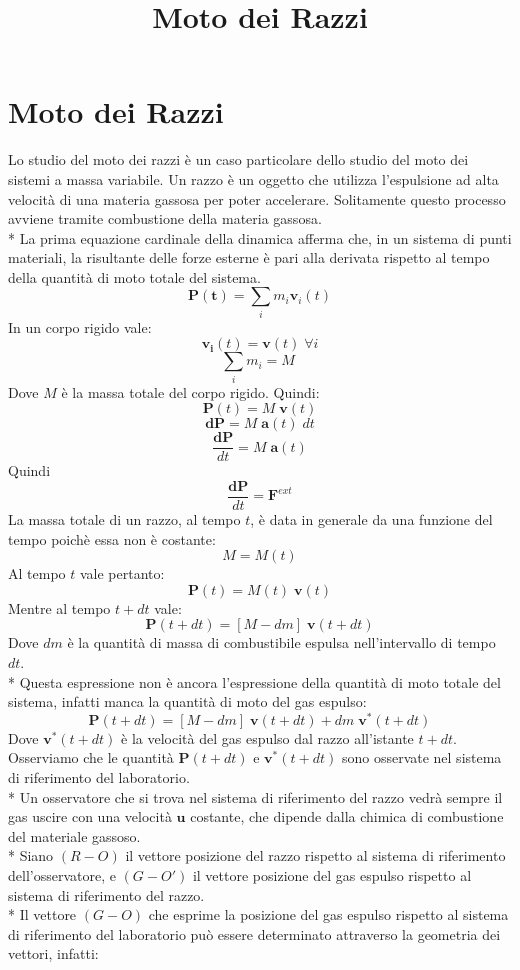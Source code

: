 \documentclass[10pt,a4paper]{book}
\title{Moto dei Razzi}
\date{}
\begin{document}
\section*{Moto dei Razzi}
Lo studio del moto dei razzi è un caso particolare dello studio del moto dei sistemi a massa variabile. Un razzo è un oggetto che utilizza l'espulsione ad alta velocità di una materia gassosa per poter accelerare. Solitamente questo processo avviene tramite combustione della materia gassosa.\\*
La prima equazione cardinale della dinamica afferma che, in un sistema di punti materiali, la risultante delle forze esterne è pari alla derivata rispetto al tempo della quantità di moto totale del sistema.
$$
\mathbf{P(t)} = \sum_{i} m_i \mathbf{v}_{i}(t)
$$
In un corpo rigido vale:
$$
\mathbf{v_i}(t) = \mathbf{v}(t)\; \forall i
$$
$$
\sum_{i} m_i = M\;
$$
Dove $M$ è la massa totale del corpo rigido. Quindi:
$$
\mathbf{P}(t) = M\;\mathbf{v}(t)
$$
$$
\mathbf{dP} = M\;\mathbf{a}(t)\;dt
$$
$$
\frac{\mathbf{dP}}{dt} = M\;\mathbf{a}(t)
$$
Quindi
$$
\frac{\mathbf{dP}}{dt} = \mathbf{F}^{ext}
$$
La massa totale di un razzo, al tempo $t$, è data in generale da una funzione del tempo poichè essa non è costante:
$$
M = M(t)
$$
Al tempo $t$ vale pertanto:
$$
\mathbf{P}(t) = M(t)\;\mathbf{v}(t)
$$
Mentre al tempo $t + dt$ vale:
$$
\mathbf{P}(t + dt) = [M - dm]\;\mathbf{v}(t + dt)
$$
Dove $dm$ è la quantità di massa di combustibile espulsa nell'intervallo di tempo $dt$.\\*
Questa espressione non è ancora l'espressione della quantità di moto totale del sistema, infatti manca la quantità di moto del gas espulso:
$$
\mathbf{P}(t + dt) = [M - dm]\;\mathbf{v}(t + dt) + dm\;\mathbf{v^*}(t + dt)
$$
Dove $\mathbf{v^*}(t + dt)$ è la velocità del gas espulso dal razzo all'istante $t + dt$. Osserviamo che le quantità $
\mathbf{P}(t + dt)$ e $\mathbf{v^*}(t + dt)$ sono osservate nel sistema di riferimento del laboratorio.\\*
Un osservatore che si trova nel sistema di riferimento del razzo vedrà sempre il gas uscire con una velocità $\mathbf{u}$ costante, che dipende dalla chimica di combustione del materiale gassoso.\\*
Siano $(R - O)$ il vettore posizione del razzo rispetto al sistema di riferimento dell'osservatore, e $(G - O')$ il vettore posizione del gas espulso rispetto al sistema di riferimento del razzo.\\*
Il vettore $(G - O)$ che esprime la posizione del gas espulso rispetto al sistema di riferimento del laboratorio può essere determinato attraverso la geometria dei vettori, infatti:
\end{document}
